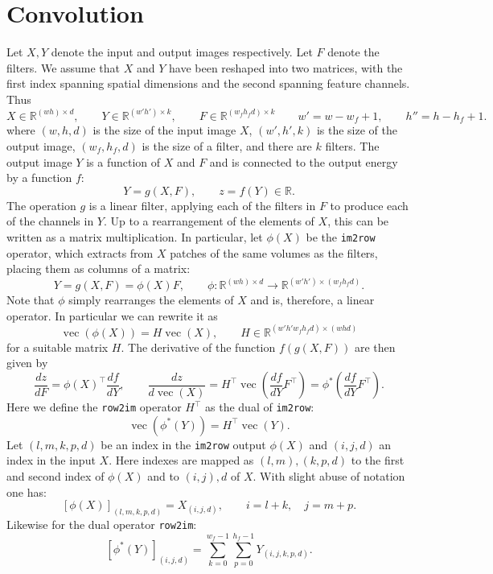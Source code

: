 \documentclass[12pt]{article}
\newcommand{\real}{\mathbb{R}}
\newcommand{\vv}{\operatorname{vec}}
\begin{document}
\section{Convolution}\label{s:convolution}

Let $X,Y$ denote the input and output images respectively. Let $F$ denote the filters. We assume that $X$ and $Y$ have been reshaped into two matrices, with the first index spanning spatial dimensions and the second spanning feature channels. Thus
\[
 X\in\real^{(wh) \times d}, \qquad
 Y\in\real^{(w'h') \times k}, \qquad
 F\in\real^{(w_fh_fd) \times k}
 \qquad
 w' = w - w_f + 1,
 \qquad
 h'' = h - h_f + 1.
\]
where $(w,h,d)$ is the size of the input image $X$, $(w',h',k)$ is the size of the output image, $(w_f,h_f,d)$ is the size of a filter, and there are $k$ filters. The output image $Y$ is a function of $X$ and $F$ and is connected to the output energy by a function $f$:
\[
Y = g(X,F),
\qquad
z = f(Y) \in \real.
\]
The operation $g$ is a linear filter, applying each of the filters in $F$ to produce each of the channels in $Y$. Up to a rearrangement of the elements of $X$, this can be written as a matrix multiplication. In particular, let $\phi(X)$ be the {\tt im2row} operator, which extracts from $X$ patches of the same volumes as the filters, placing them as columns of a matrix:
\[
 Y = g(X,F) = \phi(X) F,\qquad 
 \phi: \real^{(wh)\times d} \rightarrow \real^{(w'h')\times(w_fh_fd)}.
\]
Note that $\phi$ simply rearranges the elements of $X$ and is, therefore, a linear operator. In particular we can rewrite it as
\[
 \vv(\phi(X)) = H \vv(X), \qquad H \in \real^{(w'h'w_fh_fd) \times (whd)}
\]
for a suitable matrix $H$. The derivative of the function $f(g(X,F))$ are then given by
\[
\boxed{
\frac{dz}{dF}
=
\phi(X)^\top\frac{d f}{d Y},
\qquad
\frac{d z}{d \vv(X)}
=
H^\top
\vv\left(
\frac{d f}{d Y}F^\top
\right)
=
\phi^*\left(
\frac{d f}{d Y}F^\top
\right).
}
\]
Here we define the {\tt row2im} operator $H^\top$ as the dual of {\tt im2row}:
\[
 \vv(\phi^*(Y)) = H^\top \vv(Y).
\]
Let $(l,m,k,p,d)$ be an index in the {\tt im2row} output $\phi(X)$ and $(i,j,d)$ an index in the input $X$. Here indexes are mapped as $(l,m),(k,p,d)$ to the first and second index of $\phi(X)$ and to $(i,j),d$ of $X$. With slight abuse of notation one has:
\[
   [\phi(X)]_{(l,m,k,p,d)}= X_{(i,j,d)}, \qquad i=l+k,\quad j=m+p.
\]
Likewise for the dual operator {\tt row2im}:
\[
   [\phi^*(Y)]_{(i,j,d)} 
   = \sum_{k=0}^{w_f-1} \sum_{p=0}^{h_f-1} Y_{(i,j,k,p,d)}.
\]
\end{document}
